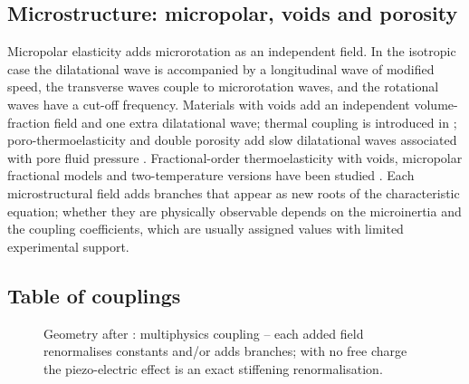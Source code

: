 \subsection{Microstructure: micropolar, voids and porosity}
Micropolar elasticity \citep{Eringen1966a,Eringen1999,TauchertClausAriman1968} adds microrotation as an independent field. In the isotropic case the dilatational wave is accompanied by a longitudinal wave of modified speed, the transverse waves couple to microrotation waves, and the rotational waves have a cut-off frequency. Materials with voids \citep{Nunziato1979,Cowin1983,Iesan1986} add an independent volume-fraction field and one extra dilatational wave; thermal coupling is introduced in \citep{Iesan1986}; poro-thermoelasticity and double porosity add slow dilatational waves associated with pore fluid pressure \citep{Singh2020,Kumar2022,Kumar2025}. Fractional-order thermoelasticity with voids, micropolar fractional models and two-temperature versions have been studied \citep{Bachher2019,Sharma2022,Biswas2020a,Kalkal2020,Kumar2008,Kumar2018}. Each microstructural field adds branches that appear as new roots of the characteristic equation; whether they are physically observable depends on the microinertia and the coupling coefficients, which are usually assigned values with limited experimental support.

\subsection{Table of couplings}
\begin{figure}[t!]\centering\small

\caption{Geometry after \citep{Nowacki1978,Chandrasekharaiah1984}: multiphysics coupling -- each added field renormalises constants and/or adds branches; with no free charge the piezo-electric effect is an exact stiffening renormalisation.}\label{fig:multi-geo}
\end{figure}

